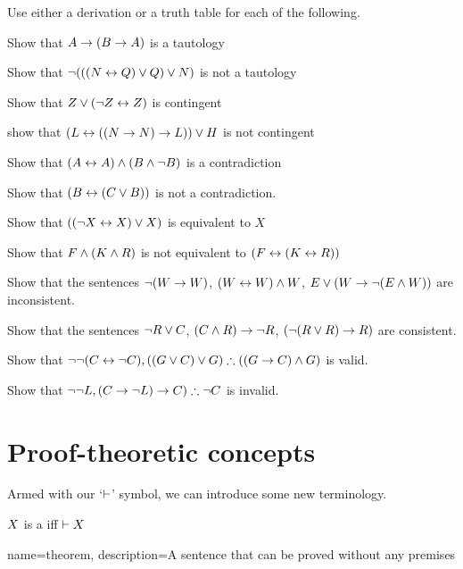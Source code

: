 \begin{practiceproblems}
\noindent\problempart Use either a derivation or a truth table for each of the following.
\begin{problemslist}%
\item Show that $A \rightarrow (B \rightarrow A)$ is a tautology
\item Show that $\neg (((N \leftrightarrow Q) \vee Q) \vee N)$ is not a tautology
\item Show that $ Z \vee (\neg Z \leftrightarrow Z) $ is contingent
\item show that $ (L \leftrightarrow ((N \rightarrow N) \rightarrow L)) \vee H $ is not contingent
\item Show that $ (A \leftrightarrow A) \mathbin{\wedge} (B \mathbin{\wedge} \neg B)$ is a contradiction
\item Show that $ (B \leftrightarrow (C \vee B)) $ is not a contradiction.
\item Show that $ ((\neg X \leftrightarrow X) \vee X) $ is equivalent to $X$
\item Show that $F \mathbin{\wedge} (K \mathbin{\wedge} R) $ is not equivalent to $ (F \leftrightarrow (K \leftrightarrow R)) $
\item Show that the sentences $ \neg (W \rightarrow W)$, $(W \leftrightarrow W) \mathbin{\wedge} W$, $E \vee (W \rightarrow \neg (E \mathbin{\wedge} W))$ are inconsistent.
\item Show that the sentences  $\neg R \vee C $, $(C \mathbin{\wedge} R) \rightarrow \neg R$, $(\neg (R \vee R) \rightarrow R) $ are consistent.
\item Show that $\enot \enot (C \eiff \enot C), ((G \eor C) \eor G) \therefore ((G \eif C) \eand G) $ is valid.
\item Show that $ \enot \enot L,  (C \eif \enot L) \eif C) \therefore \enot C$ is invalid.
\end{problemslist}
\end{practiceproblems}


\chapter{Proof-theoretic concepts}\label{sec:ProofTheoreticConcepts}


Armed with our `$\vdash$' symbol, we can introduce some new terminology.
	\begin{definition}\label{def:syntactic_tautology_in_sl}
		$X$ is a  iff $\vdash X$
	\end{definition}
{
name=theorem,
description={A sentence that can be proved without any premises}
}

